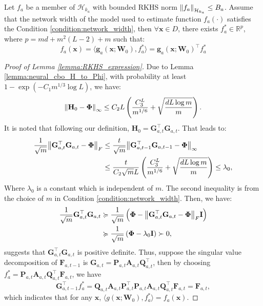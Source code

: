 \begin{lemma}
    \label{lemma:neural_cbo_RKHS_expression}
    Let $f_a$ be a member of $\mathcal{H}_{k_a}$ with bounded RKHS norm $\norm{f_a}_{\mathcal{H}_{k_a}} \le B_a$. Assume that the network width of the model used to estimate function $f_a (\cdot)$ satisfies the Condition \ref{condition:network_width}, 
    then $\forall \mathbf{x} \in D$, there exists $f_a^* \in \mathbb{R}^p$, where $p=md+m^2(L-2)+m$ such that:
    \[
    f_a(\mathbf{x}) = \langle \mathbf{g}_a(\mathbf{x}; \mathbf{W}_0), f_a^* \rangle = \mathbf{g}_a(\mathbf{x}; \mathbf{W}_0)^\top f_a^*
    \]

\begin{proof}[Proof of Lemma \ref{lemma:RKHS_expression}]
    Due to Lemma \ref{lemma:neural_cbo_H_to_Phi}, with probability at least $1 - \exp (-C_1 m^{1/3} \log L)$, we have:
    \[
    \norm{\mathbf{H}_0 - \boldsymbol{\Phi}}_\infty \le C_2 L \left(\frac{C_3^L}{m^{1/6}} + \sqrt{\frac{dL\log m}{m}}\right).
    \] 
    It is noted that following our definition,  $\mathbf{H}_0 = \mathbf{G}_{a,t} ^\top \mathbf{G}_{a,t}$. That leads to:
    \begin{align*}
        \frac{1}{\sqrt{m}}\norm{\mathbf{G}_{a,t} ^\top \mathbf{G}_{a,t} - \boldsymbol{\Phi}}_F & \le \frac{t}{\sqrt{m}} \norm{\mathbf{G}_{a,t-1} ^\top \mathbf{G}_{a,t-1} - \boldsymbol{\Phi}}_\infty 
        \\
        & \le \frac{t}{C_2 \sqrt{m} L} \left(\frac{C_3^L}{m^{1/6}} + \sqrt{\frac{dL\log m}{m}}\right)  \le \lambda_0,
    \end{align*}
    Where $\lambda_0$ is a constant which is independent of $m$. The second inequality is from the choice of $m$ in Condition \ref{condition:network_width}. 
    Then, we have:
    \begin{align*}
        \frac{1}{\sqrt{m}}\mathbf{G}_{a,t} ^\top \mathbf{G}_{a,t} & \succcurlyeq  \frac{1}{\sqrt{m}} \left(\boldsymbol{\Phi} - 
        \norm{\mathbf{G}_{a,t} ^\top \mathbf{G}_{a,t} - \boldsymbol{\Phi}}_F \mathbf{I} \right)
        \\
        & \succcurlyeq \frac{1}{\sqrt{m}} \left(\boldsymbol{\Phi} - 
        \lambda_0 \mathbf{I} \right) \succ 0, 
    \end{align*}
    suggests that $\mathbf{G}_{a,t} ^\top \mathbf{G}_{a,t}$ is positive definite.  Thus, suppose the singular value decomposition of $\mathbf{F}_{a,t-1}$ is $\mathbf{G}_{a,t} = \mathbf{P}_{a,t} \mathbf{A}_{a,t} \mathbf{Q}_{a,t}^\top$, then by choosing $f_a^* = \mathbf{P}_{a,t} \mathbf{A}_{a,t} \mathbf{Q}_{a,t}^\top \mathbf{F}_{a,t}$, we have
    \[
    \mathbf{G}_{a,t-1}^\top f_a^* =  \mathbf{Q}_{a,t} \mathbf{A}_{a,t} \mathbf{P}_{a,t}^\top \mathbf{P}_{a,t} \mathbf{A}_{a,t} \mathbf{Q}_{a,t}^\top \mathbf{F}_{a,t}  = \mathbf{F}_{a,t}, 
    \]
    which indicates that for any $\mathbf{x}$, $\langle g(\mathbf{x}; \mathbf{W}_0), f_a^*\rangle = f_a(\mathbf{x})$.
\end{proof}
\end{lemma}
